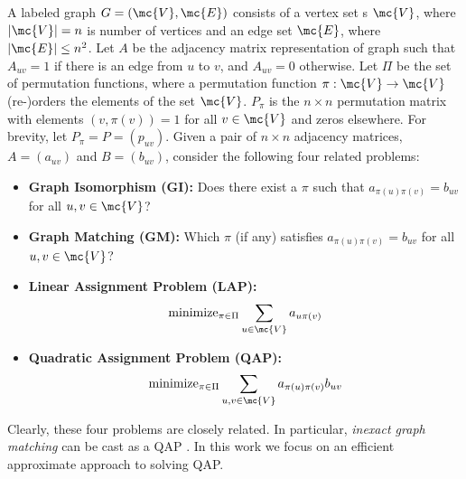 \documentclass[10pt,journal,cspaper,compsoc]{IEEEtran}
\newcommand{\PmcP}{P \in \mc{P}}
\begin{document}
A labeled graph $G=(\mc{V},\mc{E})$ consists of a vertex set s $\mc{V}$, where $|\mc{V}|=n$ is number of vertices and an edge set $\mc{E}$, where $|\mc{E}| \leq n^2$.  Let $A$ be the adjacency matrix representation of graph such that $A_{uv}=1$ if there is an edge from $u$ to $v$, and $A_{uv}=0$ otherwise. 
Let  $\Pi$ be the set of permutation functions, where a permutation function $\pi: \mc{V} \to \mc{V}$ (re-)orders the elements of the set $\mc{V}$.  $P_{\pi}$ is the $n \times n$ permutation matrix with elements $(v,\pi(v))=1$ for all $v \in \mc{V}$ and zeros elsewhere. For brevity, let $P_{\pi}=P=(p_{uv})$. Given a pair of $n \times n$ adjacency matrices, $A=(a_{uv})$ and $B=(b_{uv})$, consider the following four related problems:
\begin{itemize}
	\item \textbf{Graph Isomorphism (GI):}  Does there exist a $\pi$ such that $a_{\pi(u)\pi(v)}=b_{uv}$ for all $u,v \in \mc{V}$?
	\item \textbf{Graph Matching (GM):} Which $\pi$ (if any) satisfies $a_{\pi(u)\pi(v)}=b_{uv}$ for all $u,v \in \mc{V}$?
	\item \textbf{Linear Assignment Problem (LAP):} 
	\begin{align}
		\text{minimize}_{\pi \in \Pi} \sum_{u \in \mc{V}} a_{u \pi(v)}
	\end{align}
	\item \textbf{Quadratic Assignment Problem (QAP):} 
	\begin{align}
		\text{minimize}_{\pi \in \Pi} \sum_{u,v \in \mc{V}} a_{\pi(u) \pi(v)}b_{uv}
	\end{align}
\end{itemize}

Clearly, these four problems are closely related. In particular, \emph{inexact graph matching} can be cast as a QAP \cite{Burkard2009}.  In this work we focus on an efficient approximate approach to solving QAP.  


\end{document}
